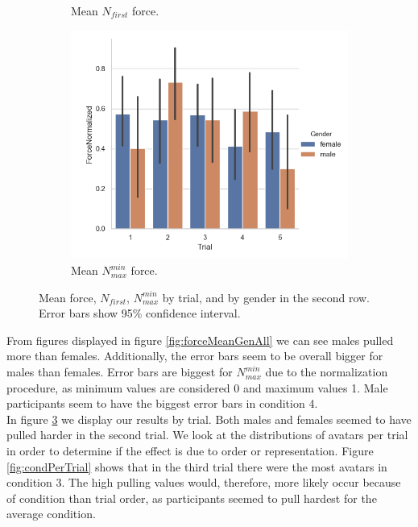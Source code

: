 \begin{figure}[H]
\begin{subfigure}[b]{0.3\textwidth}
         \caption{Mean $N_{first}$ force.}
     \label{fig:forceN1TrialGen}
     \end{subfigure}
     \hspace{7mm}
      \begin{subfigure}[b]{0.3\textwidth}
         \centering
     \includegraphics[scale=0.4]{Files/Plots/forceNormalized_mean_by_trial_gen.png}
         \caption{Mean $N_{max}^{min}$ force.}
     \label{fig:forceN2TrialGen}
     \end{subfigure}
     \caption{Mean force, $N_{first}$, $N_{max}^{min}$  by trial, and by gender in the second row. Error bars show 95\%  confidence interval.}
     \label{fig:allForceTrial}
\end{figure} 
From figures displayed in figure \ref{fig:forceMeanGenAll} we can see males pulled more than females. Additionally, the error bars seem to be overall bigger for males than females. Error bars are biggest for $N_{max}^{min}$ due to the normalization procedure, as minimum values are considered 0 and maximum values 1. Male participants seem to have the biggest error bars in condition 4.
\\
In figure \ref{fig:allForceTrial} we display our results by trial. Both males and females seemed to have pulled harder in the second trial. We look at the distributions of avatars per trial in order to determine if the effect is due to order or representation. Figure \ref{fig:condPerTrial} shows that in the third trial there were the most avatars in condition 3. The high pulling values would, therefore, more likely occur because of condition than trial order, as participants seemed to pull hardest for the average condition.
